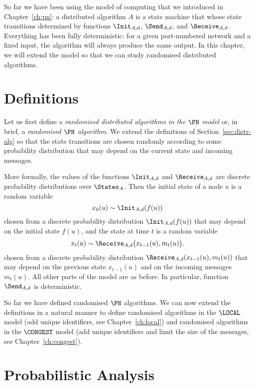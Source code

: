 
So far we have been using the model of computing that we introduced in Chapter~\ref{ch:pn}: a distributed algorithm $A$ is a state machine that whose state transitions determined by functions $\Init_{A,d}$, $\Send_{A,d}$, and $\Receive_{A,d}$. Everything has been fully deterministic: for a given port-numbered network and a fixed input, the algorithm will always produce the same output. In this chapter, we will extend the model so that we can study randomised distributed algorithms.


\section{Definitions}\label{sec:randomised}

Let us first define a \emph{randomised distributed algorithms in the $\PN$ model} or, in brief, a \emph{randomised $\PN$ algorithm}. We extend the definitions of Section~\ref{sec:distr-alg} so that the state transitions are chosen randomly according to some probability distribution that may depend on the current state and incoming messages.

More formally, the values of the functions $\Init_{A,d}$ and $\Receive_{A,d}$ are discrete probability distributions over $\States_A$. Then the initial state of a node $u$ is a random variable
\[
    x_0(u) \sim \Init_{A,d}(f(u))
\]
chosen from a discrete probability distribution $\Init_{A,d}(f(u))$ that may depend on the initial state $f(u)$, and the state at time $t$ is a random variable
\[
    x_t(u) \sim \Receive_{A,d}\bigl(x_{t-1}(u), m_t(u) \bigr).
\]
chosen from a discrete probability distribution $\Receive_{A,d}(x_{t-1}(u), m_t(u))$ that may depend on the previous state $x_{t-1}(u)$ and on the incoming messages $m_t(u)$. All other parts of the model are as before. In particular, function $\Send_{A,d}$ is deterministic.

So far we have defined randomised $\PN$ algorithms. We can now extend the definitions in a natural manner to define randomised algorithms in the $\LOCAL$ model (add unique identifiers, see Chapter~\ref{ch:local}) and randomised algorithms in the $\CONGEST$ model (add unique identifiers and limit the size of the messages, see Chapter~\ref{ch:congest}).


\section{Probabilistic Analysis}

